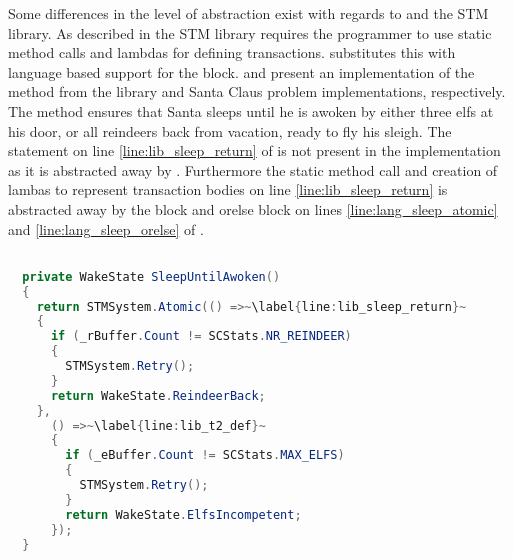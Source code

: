 Some differences in the level of abstraction exist with regards to \stmname and the \ac{STM} library. As described in  the \ac{STM} library requires the programmer to use static method calls and lambdas for defining transactions. \stmname substitutes this with language based support for the  block.  and  present an implementation of the  method from the library and \stmname Santa Claus problem implementations, respectively. The method ensures that Santa sleeps until he is awoken by either three elfs at his door, or all reindeers back from vacation, ready to fly his sleigh. The  statement on line \ref{line:lib_sleep_return} of  is not present in the \stmname implementation as it is abstracted away by \stmname. Furthermore the static method call and creation of lambas to represent transaction bodies on line \ref{line:lib_sleep_return} is abstracted away by the  block and orelse block on lines \ref{line:lang_sleep_atomic} and \ref{line:lang_sleep_orelse} of .

\begin{lstlisting}[label=lst:lib_SleepUntilAwoken,
  caption={\bscode{SleepUntilAwoken} Method - \ac{STM} Library},
  language=Java,  
  showspaces=false,
  showtabs=false,
  breaklines=true,
  showstringspaces=false,
  breakatwhitespace=true,
  escapechar=~,
  commentstyle=\color{greencomments},
  keywordstyle=\color{bluekeywords},
  stringstyle=\color{redstrings},
  morekeywords={atomic, retry, orelse, var, get, set, ref, out}]  % Start your code-block

  private WakeState SleepUntilAwoken()
  {
    return STMSystem.Atomic(() =>~\label{line:lib_sleep_return}~
    {
      if (_rBuffer.Count != SCStats.NR_REINDEER)
      {
        STMSystem.Retry();
      }
      return WakeState.ReindeerBack;
    },
      () =>~\label{line:lib_t2_def}~
      {
        if (_eBuffer.Count != SCStats.MAX_ELFS)
        {
          STMSystem.Retry();
        }
        return WakeState.ElfsIncompetent;
      });
  }
\end{lstlisting}

